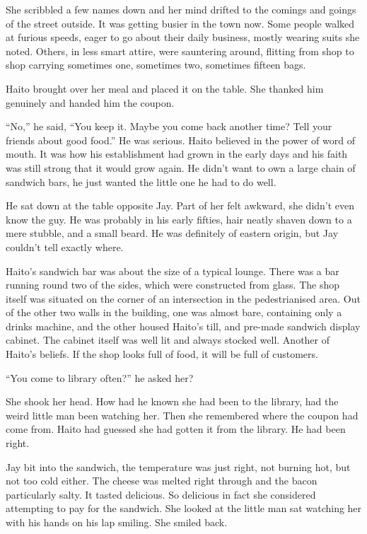 She scribbled a few names down and her mind drifted to the comings and goings of the street outside.  It was getting busier in the town now.  Some people walked at furious speeds, eager to go about their daily business, mostly wearing suits she noted.  Others, in less smart attire, were sauntering around, flitting from shop to shop carrying sometimes one, sometimes two, sometimes fifteen bags.  

Haito brought over her meal and placed it on the table.  She thanked him genuinely and handed him the coupon.

``No,'' he said, ``You keep it.  Maybe you come back another time?  Tell your friends about good food.''  He was serious.  Haito believed in the power of word of mouth.  It was how his establishment had grown in the early days and his faith was still strong that it would grow again.  He didn't want to own a large chain of sandwich bars, he just wanted the little one he had to do well.

He sat down at the table opposite Jay.  Part of her felt awkward, she didn't even know the guy.  He was probably in his early fifties, hair neatly shaven down to a mere stubble, and a small beard.  He was definitely of eastern origin, but Jay couldn't tell exactly where.

Haito's sandwich bar was about the size of a typical lounge.  There was a bar running round two of the sides, which were constructed from glass.  The shop itself was situated on the corner of an intersection in the pedestrianised area.  Out of the other two walls in the building, one was almost bare, containing only a drinks machine, and the other housed Haito's till, and pre-made sandwich display cabinet.  The cabinet itself was well lit and always stocked well.  Another of Haito's beliefs.  If the shop looks full of food, it will be full of customers.  

``You come to library often?'' he asked her?

She shook her head.  How had he known she had been to the library, had the weird little man been watching her.  Then she remembered where the coupon had come from.  Haito had guessed she had gotten it from the library.  He had been right.

Jay bit into the sandwich, the temperature was just right, not burning hot, but not too cold either.  The cheese was melted right through and the bacon particularly salty.  It tasted delicious.  So delicious in fact she considered attempting to pay for the sandwich.  She looked at the little man sat watching her with his hands on his lap smiling.  She smiled back.


